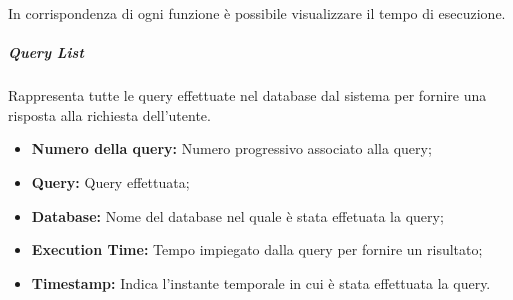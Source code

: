 In corrispondenza di ogni funzione è possibile visualizzare il tempo di esecuzione.

   

\subparagraph {Query List} \Spazio
Rappresenta tutte le query effettuate nel database dal sistema per fornire una risposta alla richiesta dell'utente.
    \begin{itemize}
	
	\item \textbf{Numero della query:} Numero progressivo associato alla query;
	\item \textbf{Query:} Query effettuata;
	\item \textbf{Database:} Nome del database nel quale è stata effetuata la query;
	\item \textbf{Execution Time:} Tempo impiegato dalla query per fornire un risultato;
	\item \textbf{Timestamp:} Indica l'instante temporale in cui è stata effettuata la query.
	
\end{itemize}







